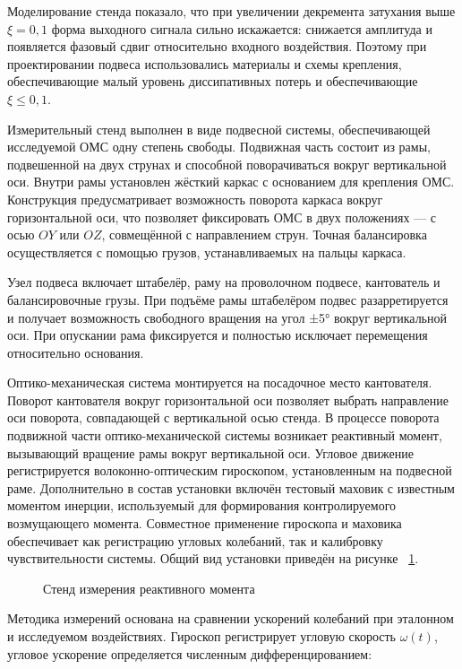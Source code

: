 Моделирование стенда показало, что при увеличении декремента затухания выше $\xi=0,1$ форма выходного сигнала сильно искажается: снижается амплитуда и появляется фазовый сдвиг относительно входного воздействия. Поэтому при проектировании подвеса использовались материалы и схемы крепления, обеспечивающие малый уровень диссипативных потерь и обеспечивающие $\xi \leq 0,1$.



Измерительный стенд выполнен в виде подвесной системы, обеспечивающей исследуемой ОМС одну степень свободы. Подвижная часть состоит из рамы, подвешенной на двух струнах и способной поворачиваться вокруг вертикальной оси. Внутри рамы установлен жёсткий каркас с основанием для крепления ОМС. Конструкция предусматривает возможность поворота каркаса вокруг горизонтальной оси, что позволяет фиксировать ОМС в двух положениях — с осью $OY$ или $OZ$, совмещённой с направлением струн. Точная балансировка осуществляется с помощью грузов, устанавливаемых на пальцы каркаса.

Узел подвеса включает штабелёр, раму на проволочном подвесе, кантователь и балансировочные грузы. При подъёме рамы штабелёром подвес разарретируется и получает возможность свободного вращения на угол ±5° вокруг вертикальной оси. При опускании рама фиксируется и полностью исключает перемещения относительно основания.

Оптико-механическая система монтируется на посадочное место кантователя. Поворот кантователя вокруг горизонтальной оси позволяет выбрать направление оси поворота, совпадающей с вертикальной осью стенда. В процессе поворота подвижной части оптико-механической системы возникает реактивный момент, вызывающий вращение рамы вокруг вертикальной оси. Угловое движение регистрируется волоконно-оптическим гироскопом, установленным на подвесной раме. Дополнительно в состав установки включён тестовый маховик с известным моментом инерции, используемый для формирования контролируемого возмущающего момента. Совместное применение гироскопа и маховика обеспечивает как регистрацию угловых колебаний, так и калибровку чувствительности системы. Общий вид установки приведён на рисунке ~\cref{fig:yoiom}.

\begin{figure}[!h] 
	\caption{Стенд измерения реактивного момента}
	\label{fig:yoiom} 
\end{figure}

Методика измерений основана на сравнении ускорений колебаний при эталонном и исследуемом воздействиях. Гироскоп регистрирует угловую скорость $\omega(t)$, угловое ускорение определяется численным дифференцированием:

